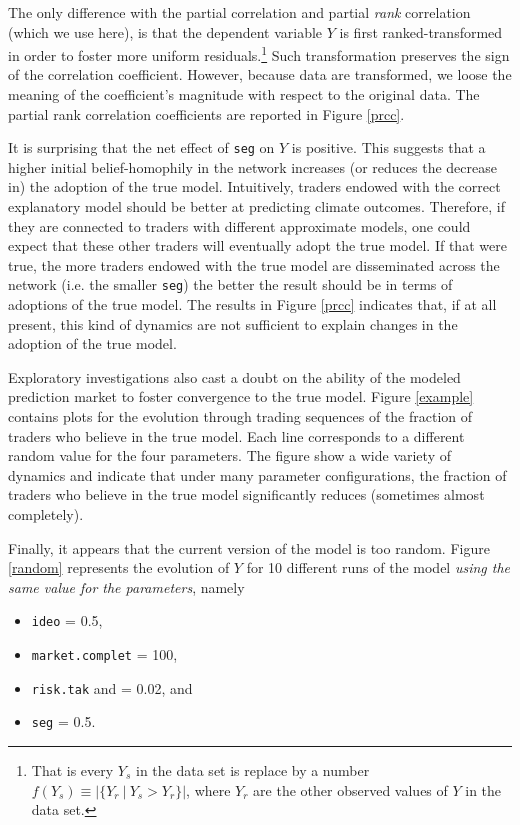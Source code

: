 \documentclass{sig-alternate}
\begin{document}
	The only difference with the partial correlation and partial \emph{rank} correlation (which we use here), is that the dependent variable $Y$ is first ranked-transformed in order to foster more uniform residuals.\footnote{That is every $Y_s$ in the data set is replace by a number $f(Y_s) \equiv |\{Y_r~|~ Y_s > Y_r\}|$, where $Y_r$ are the other observed values of $Y$ in the data set.} Such transformation preserves the sign of the correlation coefficient. However, because data are transformed, we loose the meaning of the coefficient's magnitude with respect to the original data. The partial rank correlation coefficients are reported in Figure \ref{prcc}. 
	
	 It is surprising that the net effect of \texttt{seg} on $Y$ is positive. This suggests that a higher initial belief-homophily in the network increases (or reduces the decrease in) the adoption of the true model. Intuitively, traders endowed with the correct explanatory model should be better at predicting climate outcomes. Therefore, if they are connected to traders with different approximate models, one could expect that these other traders will eventually adopt the true model. If that were true, the more traders endowed with the true model are disseminated across the network (i.e. the smaller \texttt{seg}) the better the result should be in terms of adoptions of the true model. The results  in Figure \ref{prcc} indicates that, if at all present, this kind of dynamics are not sufficient to explain changes in the adoption of the true model.
	
	Exploratory investigations also cast a doubt on the ability of the modeled prediction market to foster convergence to the true model. Figure \ref{example} contains plots for the evolution through trading sequences of the fraction of traders who believe in the true model. Each line corresponds to a different random value for the four parameters. The figure show a wide variety of dynamics and indicate that under many parameter configurations, the fraction of traders who believe in the true model significantly reduces (sometimes almost completely).
	
	Finally, it appears that the current version of the model is too random. Figure \ref{random} represents the evolution of $Y$ for 10 different runs of the model \emph{using the same value for the parameters}, namely 
	
	\begin{itemize}
		\item \texttt{ideo} = 0.5,
		\item \texttt{market.complet} = 100,
		\item \texttt{risk.tak} and = 0.02, and
		\item  \texttt{seg} = 0.5.
	\end{itemize}
	
\end{document}

